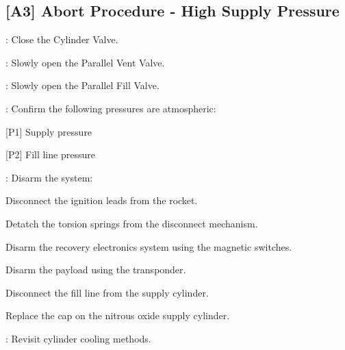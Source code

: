 \begin{checklist}
\subsection{[A3] Abort Procedure - High Supply Pressure}
\begin{checklist}
    \item \primary{}: Close the Cylinder Valve.
    \item \primary{}: Slowly open the Parallel Vent Valve.
    \item \primary{}: Slowly open the Parallel Fill Valve.
    \item \control{}: Confirm the following pressures are atmospheric:
    \begin{checklist}
        \item {[P1]} Supply pressure
        \item {[P2]} Fill line pressure
    \end{checklist}
    \item \primary{}: Disarm the system:
        \begin{checklist}    
            \item Disconnect the ignition leads from the rocket.
            \item Detatch the torsion springs from the disconnect mechanism.
            \item Disarm the recovery electronics system using the magnetic switches.
            \item Disarm the payload using the transponder.
            \item Disconnect the fill line from the supply cylinder.
            \item Replace the cap on the nitrous oxide supply cylinder.
        \end{checklist}
    \item \ops{}: Revisit cylinder cooling methods.
\end{checklist}
\setcounter{checklistnum}{0}


\end{checklist}
